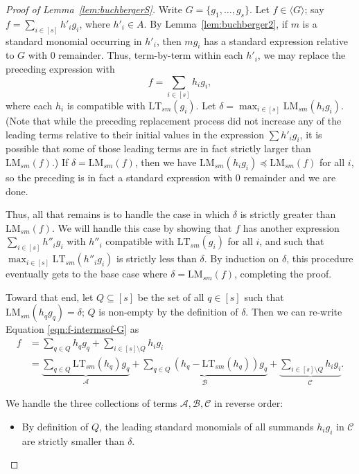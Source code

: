 \documentclass[11pt,reqno]{amsart}
\newcommand{\lmsm}{\text{LM}_{sm}}
\newcommand{\ltsm}{\text{LT}_{sm}}
\theoremstyle{definition}
\numberwithin{equation}{section}
\begin{document}
\begin{proof}[Proof of Lemma~\ref{lem:buchbergerS}]
Write $G = \{g_1, \dotsc, g_s\}$. Let $f \in \langle G \rangle$; say $f = \sum_{i \in [s]} h'_i g_i$, where $h'_i \in A$. By Lemma~\ref{lem:buchberger2}, if $m$ is a standard monomial occurring in $h'_i$, then $m g_i$ has a standard expression relative to $G$ with 0 remainder. 
Thus, term-by-term within each $h'_i$, we may replace the preceding expression with 
\begin{equation}\label{eqn:f-intermsof-G} 
f = \sum_{i\in [s]}h_ig_i,
\end{equation} 
where each $h_i$ is compatible with $\ltsm(g_i)$. Let $\delta = \max_{i \in [s]}\lmsm(h_ig_i)$. (Note that while the preceding replacement process did not increase any of the leading terms relative to their initial values in the expression $\sum h'_i g_i$, it is possible that some of those leading terms are in fact strictly larger than $\lmsm(f)$.) If $\delta = \lmsm(f)$, then we have $\lmsm(h_i g_i) \preceq \lmsm(f)$ for all $i$, so the preceding is in fact a standard expression with 0 remainder 
and we are done. 

Thus, all that remains is to handle the case in which $\delta$ is strictly greater than $\lmsm(f)$. We will handle this case by showing that $f$ has another expression $\sum_{i \in [s]} h''_i g_i$ with $h''_i$ compatible with $\ltsm(g_i)$ for all $i$, and such that $\max_{i \in [s]} \ltsm(h''_i g_i)$ is strictly less than $\delta$. By induction on $\delta$, this procedure eventually gets to the base case where $\delta = \lmsm(f)$, completing the proof.

Toward that end, let $Q \subseteq [s]$ be the set of all $q \in [s]$ such that $\lmsm(h_qg_q) = \delta$; $Q$ is non-empty by the definition of $\delta$. Then we can re-write Equation \eqref{eqn:f-intermsof-G} as \begin{align}
f &= \sum_{q\in Q} h_qg_q + \sum_{i \in [s]\setminus Q}h_ig_i \nonumber \\
&= \underbrace{\sum_{q \in Q} \ltsm(h_q)g_q}_{\mathcal{A}} + \underbrace{\sum_{q \in Q} \left(h_q - \ltsm(h_q)\right)g_q}_{\mathcal{B}} + \underbrace{\sum_{i \in [s]\setminus Q}h_ig_i}_{\mathcal{C}}. \label{eqn:f-isolate}
\end{align}

We handle the three collections of terms $\mathcal{A}, \mathcal{B}, \mathcal{C}$ in reverse order:
\begin{itemize}
\item By definition of $Q$, the leading standard monomials of all summands $h_i g_i$ in $\mathcal{C}$ are strictly smaller than $\delta$. 


\end{itemize}
\end{proof}
\end{document}
